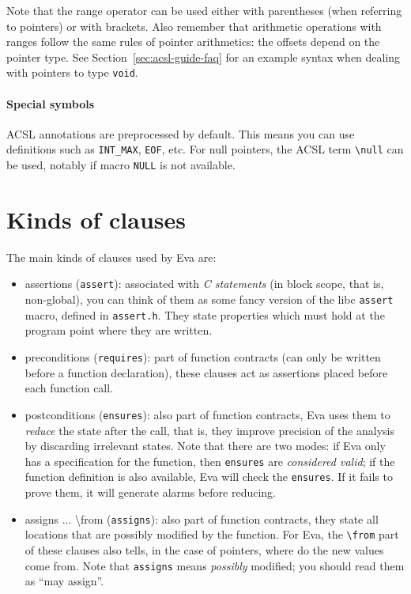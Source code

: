 \documentclass[web]{frama-c-book}
\newcommand{\Eva}{\textsf{Eva}}
\begin{document}
Note that the range operator can be used either with parentheses
(when referring to pointers) or with brackets. Also remember that arithmetic
operations with ranges follow the same rules of pointer arithmetics:
the offsets depend on the pointer type. See Section~\ref{sec:acsl-guide-faq}
for an example syntax when dealing with pointers to type \texttt{void}.

\paragraph{Special symbols}

ACSL annotations are preprocessed by default. This means you can use
definitions such as \verb+INT_MAX+, \verb+EOF+, etc.
For null pointers, the ACSL term \verb+\null+ can be used, notably if macro 
\verb+NULL+ is not available.

\section{Kinds of clauses}

The main kinds of clauses used by \Eva{} are:
\begin{itemize}
\item assertions (\texttt{assert}): associated with {\em C statements}
  (in block scope, that is, non-global), you can think of them as some
  fancy version of the libc \texttt{assert} macro, defined in
  \texttt{assert.h}. They state properties which must hold at the program
  point where they are written.
\item preconditions (\texttt{requires}): part of function contracts
  (can only be written before a function declaration), these clauses
  act as assertions placed before each function call.
\item postconditions (\texttt{ensures}): also part of function contracts,
  \Eva{} uses them to {\em reduce} the state after the call, that is, they
  improve precision of the analysis by discarding irrelevant states.
  Note that there are two modes: if \Eva{} only has a specification for the
  function, then \texttt{ensures} are {\em considered valid}; if the function
  definition is also available, \Eva{} will check the \texttt{ensures}. If it
  fails to prove them, it will generate alarms before reducing.
\item assigns ... \textbackslash{}from (\texttt{assigns}): also part of function contracts,
  they state all locations that are possibly modified by the function. For \Eva{},
  the \verb+\from+ part of these clauses also tells, in the case of pointers,
  where do the new values come from. Note that \verb+assigns+ means
  {\em possibly} modified; you should read them as ``may assign''.
\end{itemize}
\end{document}
